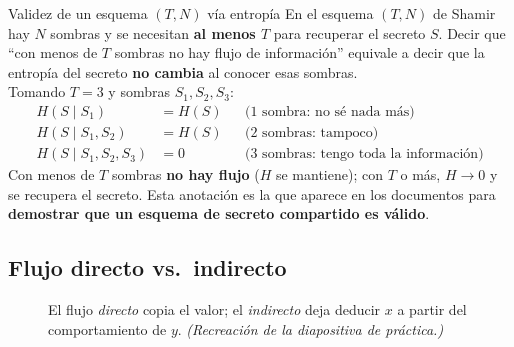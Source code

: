 \documentclass[11pt,a4paper]{article}
\begin{document}
\begin{defbox}{Validez de un esquema $(T,N)$ vía entropía}
En el esquema $(T,N)$ de Shamir hay $N$ sombras y se necesitan \textbf{al menos $T$} para
recuperar el secreto $S$. Decir que ``con menos de $T$ sombras no hay flujo de información''
equivale a decir que la entropía del secreto \textbf{no cambia} al conocer esas sombras.\\[4pt]
Tomando $T=3$ y sombras $S_1,S_2,S_3$:
\[
\begin{aligned}
H(S \mid S_1) &= H(S) && \text{(1 sombra: no sé nada más)}\\
H(S \mid S_1, S_2) &= H(S) && \text{(2 sombras: tampoco)}\\
H(S \mid S_1, S_2, S_3) &= 0 && \text{(3 sombras: tengo toda la información)}
\end{aligned}
\]
Con menos de $T$ sombras \textbf{no hay flujo} ($H$ se mantiene); con $T$ o más, $H\to 0$ y se
recupera el secreto. Esta anotación es la que aparece en los documentos para \textbf{demostrar
que un esquema de secreto compartido es válido}.
\end{defbox}

\subsection{Flujo directo vs.\ indirecto}

\begin{figure}[h]
\centering
{}
\caption{El flujo \emph{directo} copia el valor; el \emph{indirecto} deja deducir $x$ a partir
del comportamiento de $y$. \textit{(Recreación de la diapositiva de práctica.)}}
\end{figure}
\end{document}
